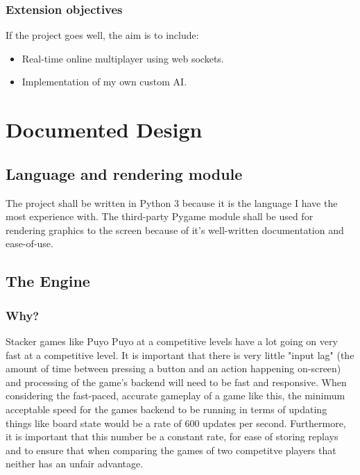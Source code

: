 \documentclass{report}
\begin{document}
\subsection{Extension objectives}

If the project goes well, the aim is to include:
\begin{itemize}
    \renewcommand\labelitemi{--}
    \item Real-time online multiplayer using web sockets.
    \item Implementation of my own custom AI.
\end{itemize} 

\chapter{Documented Design}

\section{Language and rendering module}

The project shall be written in Python 3 because it is the language I have the most experience with. The third-party Pygame module shall be used for rendering graphics to the screen because of it's well-written documentation and ease-of-use.

\section{The Engine}

\subsection{Why?}

Stacker games like Puyo Puyo at a competitive levels have a lot going on very fast at a competitive level. It is important that there is very little "input lag" (the amount of time between pressing a button and an action happening on-screen) and processing of the game's backend will need to be fast and responsive. When considering the fast-paced, accurate gameplay of a game like this, the minimum acceptable speed for the games backend to be running in terms of updating things like board state would be a rate of 600 updates per second. Furthermore, it is important that this number be a constant rate, for ease of storing replays and to ensure that when comparing the games of two competitve players that neither has an unfair advantage.
\end{document}
